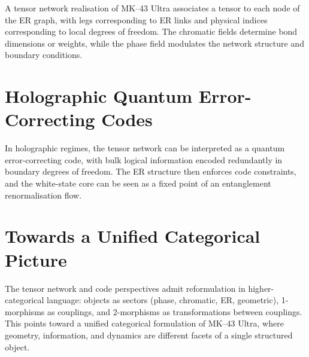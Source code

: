 A tensor network realisation of MK--43 Ultra associates a tensor to each node of the ER graph, with legs corresponding to ER links and physical indices corresponding to local degrees of freedom.
The chromatic fields determine bond dimensions or weights, while the phase field modulates the network structure and boundary conditions.

\section{Holographic Quantum Error-Correcting Codes}

In holographic regimes, the tensor network can be interpreted as a quantum error-correcting code, with bulk logical information encoded redundantly in boundary degrees of freedom.
The ER structure then enforces code constraints, and the white-state core can be seen as a fixed point of an entanglement renormalisation flow.

\section{Towards a Unified Categorical Picture}

The tensor network and code perspectives admit reformulation in higher-categorical language:
objects as sectors (phase, chromatic, ER, geometric), 1-morphisms as couplings, and 2-morphisms as transformations between couplings.
This points toward a unified categorical formulation of MK--43 Ultra, where geometry, information, and dynamics are different facets of a single structured object.
